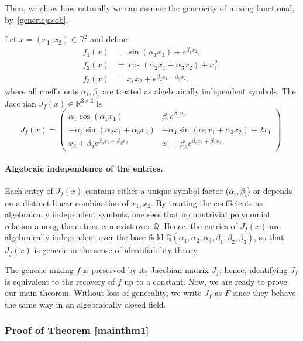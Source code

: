 \documentclass[10pt]{article}
\numberwithin{figure}{section}
\begin{document}
Then, we show how naturally we can assume the genericity of mixing functional, by~\autoref{genericjacob}. 

\begin{aexample}\label{genericjacob}
Let $x=(x_1,x_2)\in\mathbb{R}^2$ and define
\[
\begin{aligned}
f_1(x) &= \sin(\alpha_1 x_1) + e^{\beta_1 x_2},\\
f_2(x) &= \cos(\alpha_2 x_1 + \alpha_3 x_2) + x_1^2,\\
f_3(x) &= x_1 x_2 + e^{\beta_2 x_1 + \beta_3 x_2},
\end{aligned}
\]
where all coefficients $\alpha_i, \beta_i$ are treated as algebraically independent symbols.
The Jacobian $J_f(x)\in\mathbb{R}^{3\times 2}$ is
\[
J_f(x)=
\begin{pmatrix}
\alpha_1 \cos(\alpha_1 x_1) & \beta_1 e^{\beta_1 x_2} \\[2mm]
-\alpha_2 \sin(\alpha_2 x_1+\alpha_3 x_2) & -\alpha_3 \sin(\alpha_2 x_1+\alpha_3 x_2) + 2 x_1 \\[2mm]
x_2 + \beta_2 e^{\beta_2 x_1+\beta_3 x_2} & x_1 + \beta_3 e^{\beta_2 x_1+\beta_3 x_2}
\end{pmatrix}.
\]

\paragraph{Algebraic independence of the entries.}
Each entry of $J_f(x)$ contains either a unique symbol factor ($\alpha_i, \beta_i$) 
or depends on a distinct linear combination of $x_1,x_2$.
By treating the coefficients as algebraically independent symbols, 
one sees that no nontrivial polynomial relation among the entries can exist over $\mathbb{Q}$.
Hence, the entries of $J_f(x)$ are algebraically independent over the base field 
$\mathbb{Q}(\alpha_1,\alpha_2,\alpha_3,\beta_1,\beta_2,\beta_3)$, 
so that $J_f(x)$ is generic in the sense of identifiability theory.
\end{aexample}



The generic mixing $f$ is preserved by its Jacobian matrix $J_f$; hence, identifying $J_f$ is equivalent to the recovery of $f$ up to a constant. Now, we are ready to prove our main theorem. Without loss of generality, we write $J_f$ as $F$ since they behave the same way in an algebraically closed field. 

\subsubsection{Proof of Theorem \ref{mainthm1} }\label{proof_mainthm1}
\end{document}
